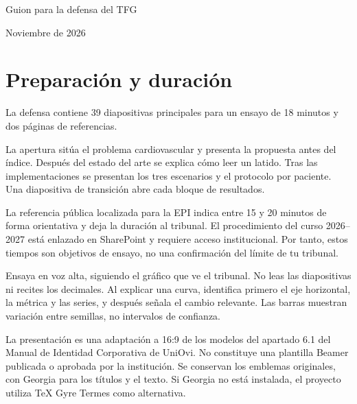 \documentclass[11pt,a4paper]{article}
\begin{document}
\begin{center}{\LARGE Guion para la defensa del TFG}\par\medskip
{\large\ThesisTitle}\par\medskip\AuthorName\par Noviembre de 2026\end{center}
\section*{Preparación y duración}
La defensa contiene 39 diapositivas principales para un ensayo de 18 minutos y dos páginas de referencias.

La apertura sitúa el problema cardiovascular y presenta la propuesta antes del índice. Después del estado del arte se explica cómo leer un latido. Tras las implementaciones se presentan los tres escenarios y el protocolo por paciente. Una diapositiva de transición abre cada bloque de resultados.

La referencia pública localizada para la EPI indica entre 15 y 20 minutos de forma orientativa y deja la duración al tribunal. El procedimiento del curso 2026--2027 está enlazado en SharePoint y requiere acceso institucional. Por tanto, estos tiempos son objetivos de ensayo, no una confirmación del límite de tu tribunal.

Ensaya en voz alta, siguiendo el gráfico que ve el tribunal. No leas las diapositivas ni recites los decimales. Al explicar una curva, identifica primero el eje horizontal, la métrica y las series, y después señala el cambio relevante. Las barras muestran variación entre semillas, no intervalos de confianza.

La presentación es una adaptación a 16:9 de los modelos del apartado 6.1 del Manual de Identidad Corporativa de UniOvi. No constituye una plantilla Beamer publicada o aprobada por la institución. Se conservan los emblemas originales, con Georgia para los títulos y el texto. Si Georgia no está instalada, el proyecto utiliza TeX Gyre Termes como alternativa.
\end{document}
